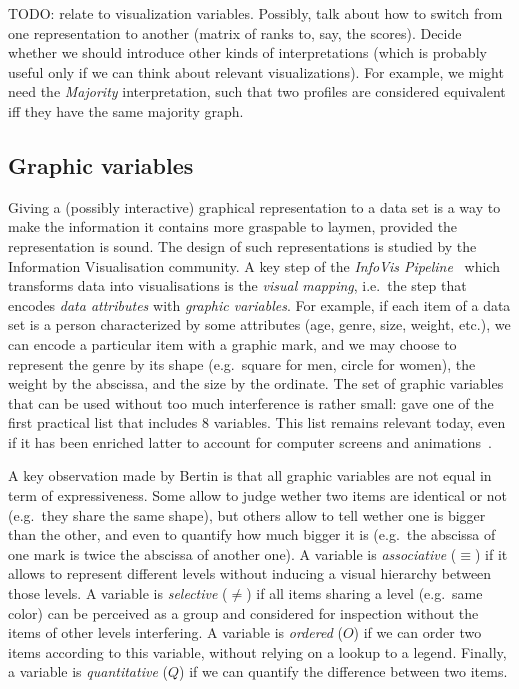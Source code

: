 \documentclass[version=last, pagesize, twoside=off, bibliography=totoc, DIV=calc, fontsize=12pt, a4paper, french, english]{scrartcl}
\begin{document}
TODO: relate to visualization variables. Possibly, talk about how to switch from one representation to another (matrix of ranks to, say, the scores). Decide whether we should introduce other kinds of interpretations (which is probably useful only if we can think about relevant visualizations). For example, we might need the \emph{Majority} interpretation, such that two profiles are considered equivalent iff they have the same majority graph.

\subsection{Graphic variables}
Giving a (possibly interactive) graphical representation to a data set is a way to make the information it contains more graspable to laymen, provided the representation is sound.
The design of such representations is studied by the Information Visualisation community.
A key step of the \emph{InfoVis Pipeline}~\citep{Chi-Riedl-1998} which transforms data into visualisations is the \emph{visual mapping}, i.e.\ the step that encodes \emph{data attributes} with \emph{graphic variables}.
For example, if each item of a data set is a person characterized by some attributes (age, genre, size, weight, etc.), we can encode a particular item with a graphic mark, and we may choose to represent the genre by its shape (e.g.\ square for men, circle for women), the weight by the abscissa, and the size by the ordinate.
The set of graphic variables that can be used without too much interference is rather small: \citet[][chap.~II.c]{bertin-graphique} gave one of the first practical list that includes 8 variables.
This list remains relevant today, even if it has been enriched latter to account for computer screens and animations~\citep[e.g.][chap.~5]{munzner}.

A key observation made by Bertin is that all graphic variables are not equal in term of expressiveness.
Some allow to judge wether two items are identical or not (e.g.\ they share the same shape), but others allow to tell wether one is bigger than the other, and even to quantify how much bigger it is (e.g.\ the abscissa of one mark is twice the abscissa of another one).
A variable is \emph{associative} ($\equiv$) if it allows to represent different levels without inducing a visual hierarchy between those levels.
A variable is \emph{selective} ($\neq$) if all items sharing a level (e.g.\ same color) can be perceived as a group and considered for inspection without the items of other levels interfering.
A variable is \emph{ordered} ($O$) if we can order two items according to this variable, without relying on a lookup to a legend.
Finally, a variable is \emph{quantitative} ($Q$) if we can quantify the difference between two items.
\end{document}
